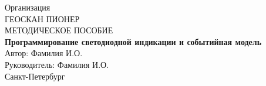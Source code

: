 \documentclass[a4paper,14pt]{extarticle}
\begin{document}
\begin{titlepage}
\begin{center}
Организация\\[1em]
ГЕОСКАН ПИОНЕР\\[10em]
МЕТОДИЧЕСКОЕ ПОСОБИЕ\\[2em]
\textbf{Программирование светодиодной индикации и событийная модель}\\[10em]
Автор: Фамилия И.О.\\[1em]
Руководитель: Фамилия И.О.\\[10em]
Санкт-Петербург\\[0.5em]
\the\year
\end{center}
\end{titlepage}
\tableofcontents
\clearpage

\clearpage

\clearpage

\clearpage

\end{document}
